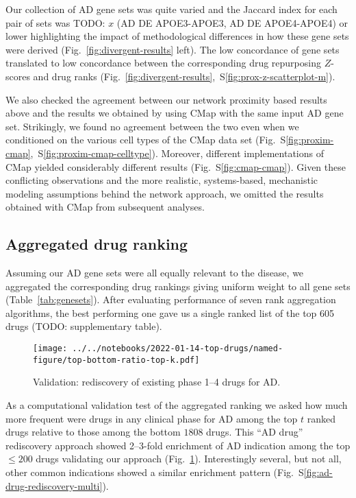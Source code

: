 \documentclass[letterpaper]{article}
\begin{document}
Our collection of AD gene sets was quite varied and the Jaccard index for each
pair of sets was TODO: $x$ (AD DE APOE3-APOE3, AD DE APOE4-APOE4) or lower
highlighting the impact of methodological differences in how these gene sets
were derived (Fig.~\ref{fig:divergent-results} left). The low concordance of
gene sets translated to low concordance between the corresponding drug
repurposing $Z$-scores and drug ranks
(Fig.~\ref{fig:divergent-results},~S\ref{fig:prox-z-scatterplot-m}).

We also checked the agreement between our network proximity based results
above and the results we obtained by using CMap with the same input AD gene
set.  Strikingly, we found no agreement between the two even when we
conditioned on the various cell types of the CMap data set
(Fig.~S\ref{fig:proxim-cmap},~S\ref{fig:proxim-cmap-celltype}).  Moreover,
different implementations of CMap yielded considerably different results
(Fig.~S\ref{fig:cmap-cmap}).  Given these conflicting observations and the more realistic,
systems-based, mechanistic modeling assumptions behind the network approach,
we omitted the results obtained with CMap from subsequent analyses.

\subsection{Aggregated drug ranking}

Assuming our AD gene sets were all equally relevant to the disease, we
aggregated the corresponding drug rankings giving uniform weight to all gene
sets (Table~\ref{tab:genesets}).  After evaluating performance of seven rank
aggregation algorithms, the best performing one gave us a single ranked list
of the top 605 drugs (TODO: supplementary table).

\begin{figure}
\texttt{[image: ../../notebooks/2022-01-14-top-drugs/named-figure/top-bottom-ratio-top-k.pdf]}
\caption{
Validation: rediscovery of existing phase 1--4 drugs for AD.
}
\label{fig:ad-drug-rediscovery}
\end{figure}

As a computational validation test of the aggregated ranking we asked how much
more frequent were drugs in any clinical phase for AD among the top $t$ ranked
drugs relative to those among the bottom $1808$ drugs.  This ``AD drug''
rediscovery approach showed 2--3-fold enrichment of AD indication among the
top $\le 200$ drugs validating our approach
(Fig.~\ref{fig:ad-drug-rediscovery}).  Interestingly several, but not all,
other common indications showed a similar enrichment pattern
(Fig.~S\ref{fig:ad-drug-rediscovery-multi}).
\end{document}
